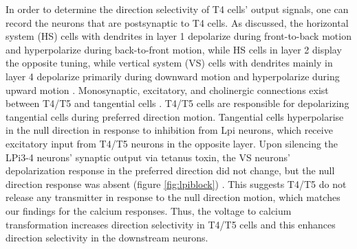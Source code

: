 In order to determine the direction selectivity of T4 cells' output signals, one can record the neurons that are postsynaptic to T4 cells. As discussed, the horizontal system (HS) cells with dendrites in layer 1 depolarize during front-to-back motion and hyperpolarize during back-to-front motion, while HS cells in layer 2 display the opposite tuning, while vertical system (VS) cells with dendrites mainly in layer 4 depolarize primarily during downward motion and hyperpolarize during upward motion \parencite{Wasserman2015, Schnell2010, Hopp2014, Scott2002}. Monosynaptic, excitatory, and cholinergic connections exist between T4/T5 and tangential cells \parencite{Mauss2014}. T4/T5 cells are responsible for depolarizing tangential cells during preferred direction motion. Tangential cells hyperpolarise in the null direction in response to inhibition from Lpi neurons, which receive excitatory input from T4/T5 neurons in the opposite layer. Upon silencing the LPi3-4 neurons’ synaptic output via tetanus toxin, the VS neurons' depolarization response in the preferred direction did not change, but the null direction response was absent (figure \ref{fig:lpiblock}) \parencite{Mauss2015}. This suggests T4/T5 do not release any transmitter in response to the null direction motion, which matches our findings for the calcium responses. Thus, the voltage to calcium transformation increases direction selectivity in T4/T5 cells and this enhances direction selectivity in the downstream neurons.


